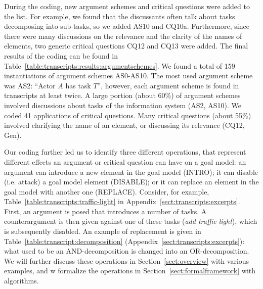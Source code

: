 During the coding, new argument schemes and critical questions were added to the list. For example, we found that the discussants often talk about tasks decomposing into sub-tasks, so we added AS10 and CQ10a. Furthermore, since there were many discussions on the relevance and the clarity of the names of elements, two generic critical questions CQ12 and CQ13 were added. The final results of the coding can be found in Table~\ref{table:transcripts:results:argumentschemes}. We found a total of 159 instantiations of argument schemes AS0-AS10. The most used argument scheme was AS2: ``Actor $A$ has task $T$'', however, each argument scheme is found in transcripts at least twice. A large portion (about 60\%) of argument schemes involved discussions about tasks of the information system (AS2, AS10). We coded 41 applications of critical questions. Many critical questions (about 55\%) involved clarifying the name of an element, or discussing its relevance (CQ12, Gen).

Our coding further led us to identify three different operations, that represent different effects an argument or critical question can have on a goal model: an argument can introduce a new element in the goal model (\textsf{INTRO}); it can disable (i.e. attack) a goal model element (\textsf{DISABLE}); or it can replace an element in the goal model with another one (\textsf{REPLACE}). Consider, for example, Table~\ref{table:transcripts:traffic-light} in Appendix~\ref{sect:transcripts:excerpts}. First, an argument is posed that introduces a number of tasks. A counterargument is then given against one of these tasks (\emph{add traffic light}), which is subsequently disabled. An example of replacement is given in Table~\ref{table:transcript:decomposition} (Appendix~\ref{sect:transcripts:excerpts}): what used to be an AND-decomposition is changed into an OR-decomposition. We will further discuss these operations in Section~\ref{sect:overview} with various examples, and w formalize the operations in Section~\ref{sect:formalframework} with algorithms.